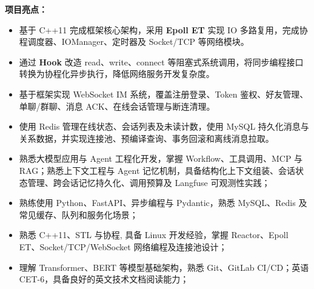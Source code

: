\textbf{项目亮点：}
\begin{itemize}
	\item 基于 C++11 完成框架核心架构，采用 \textbf{Epoll ET} 实现 IO 多路复用，完成协程调度器、IOManager、定时器及 Socket/TCP 等网络模块。
	\item 通过 \textbf{Hook} 改造 read、write、connect 等阻塞式系统调用，将同步编程接口转换为协程化异步执行，降低网络服务开发复杂度。
	\item 基于框架实现 WebSocket IM 系统，覆盖注册登录、Token 鉴权、好友管理、单聊/群聊、消息 ACK、在线会话管理与断连清理。
	\item 使用 Redis 管理在线状态、会话列表及未读计数，使用 MySQL 持久化消息与关系数据，并实现连接池、预编译查询、事务回滚和离线消息拉取。
\end{itemize}
\begin{onehalfspacing}
	\begin{itemize}
		\item 熟悉大模型应用与 Agent 工程化开发，掌握 Workflow、工具调用、MCP 与 RAG；熟悉上下文工程与 Agent 记忆机制，具备结构化上下文组装、会话状态管理、跨会话记忆持久化、调用预算及 Langfuse 可观测性实践；
		\item 熟练使用 Python、FastAPI、异步编程与 Pydantic，熟悉 MySQL、Redis 及常见缓存、队列和服务化场景；
		\item 熟悉 C++11、STL 与协程, 具备 Linux 开发经验，掌握 Reactor、Epoll ET、Socket/TCP/WebSocket 网络编程及连接池设计；
		\item 理解 Transformer、BERT 等模型基础架构，熟悉 Git、GitLab CI/CD；英语 CET-6，具备良好的英文技术文档阅读能力；
	\end{itemize}
\end{onehalfspacing}
